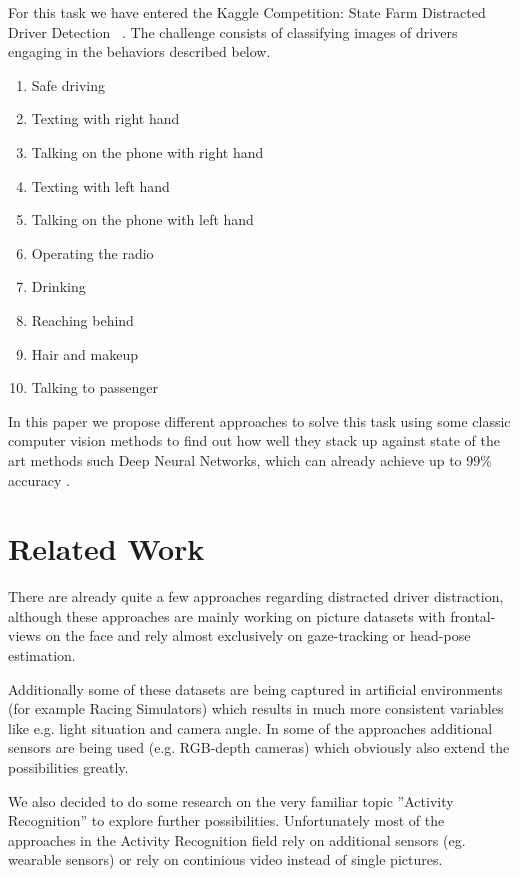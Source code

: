 \documentclass[10pt,twocolumn,letterpaper]{article}
\begin{document}
For this task we have entered the Kaggle Competition: State Farm Distracted Driver Detection ~\cite{Kaggle}. The challenge consists of classifying images of drivers engaging in the behaviors described below.

\begin{enumerate}
	\item Safe driving
	\item Texting with right hand
	\item Talking on the phone with right hand
	\item Texting with left hand
	\item Talking on the phone with left hand
	\item Operating the radio
	\item Drinking
	\item Reaching behind
	\item Hair and makeup
	\item Talking to passenger
\end{enumerate}

In this paper we propose different approaches to solve this task using some classic computer vision methods to find out how well they stack up against state of the art methods such Deep Neural Networks, which can already achieve up to 99\% accuracy .



\section{Related Work}

There are already quite a few approaches regarding distracted driver distraction, although these approaches are mainly working on picture datasets with frontal-views on the face and rely almost exclusively on gaze-tracking or head-pose estimation. \cite{Dorazio} \cite{6957817}

Additionally some of these datasets are being captured in artificial environments (for example Racing Simulators) \cite{itsc:bergasa2008} which results in much more consistent variables like e.g. light situation and camera angle. In some of the approaches additional sensors are being used (e.g. RGB-depth cameras) which obviously also extend the possibilities greatly. \cite{Ragab2014}

We also decided to do some research on the very familiar topic ''Activity Recognition'' to explore further possibilities. Unfortunately most of the approaches in the Activity Recognition field rely on additional sensors (eg. wearable sensors) \cite{6258525} \cite{6365160} or rely on continious video instead of single pictures. \cite{1315249} \cite{1430826}
\end{document}
